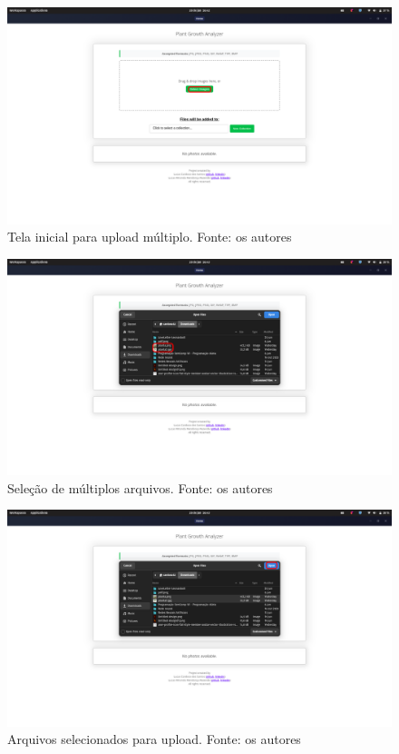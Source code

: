 \begin{figure}[H]
    \centering
    \includegraphics[width=1\textwidth]{../figures/screens/uc002/Screenshot from 2025-06-28 16-42-44.png}
    \caption{Tela inicial para upload múltiplo. Fonte: os autores}
    \label{fig:uc002-screen1}
\end{figure}

\begin{figure}[H]
    \centering
    \includegraphics[width=1\textwidth]{../figures/screens/uc002/Screenshot from 2025-06-28 16-43-08.png}
    \caption{Seleção de múltiplos arquivos. Fonte: os autores}
    \label{fig:uc002-screen2}
\end{figure}

\begin{figure}[H]
    \centering
    \includegraphics[width=1\textwidth]{../figures/screens/uc002/Screenshot from 2025-06-28 16-43-15.png}
    \caption{Arquivos selecionados para upload. Fonte: os autores}
    \label{fig:uc002-screen3}
\end{figure}

